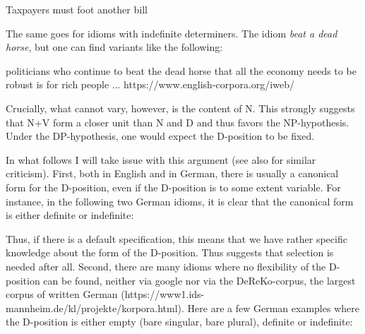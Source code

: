 \documentclass[output=paper,colorlinks,citecolor=black,
]{langscibook}
\begin{document}
\largerpage
 \ea Taxpayers must foot another bill
 \z
 
 The same goes for idioms with indefinite determiners. The idiom \textit{beat a dead horse}, but one can find variants like the following:
 
 \ea politicians who continue to beat the dead horse that all the economy needs to be robust is for rich people ... 
https://www.english-corpora.org/iweb/
 \z
 
 Crucially, what cannot vary, however, is the content of N. This strongly suggests that N+V form a closer unit than N and D and thus favors the NP-hypothesis. Under the DP-hypothesis, one would expect the D-position to be fixed.
 
 In what follows I will take issue with this argument (see also \citealt{Larson:to-appear:DP-hypothesisDP-CP} for similar criticism). First, both in English and in German, there is usually a canonical form for the D-position, even if the D-position is to some extent variable. For instance, in the following two German idioms, it is clear that the canonical form is either definite or indefinite:

 \ea
    \z
    \z
    
    Thus, if there is a default specification, this means that   we have rather specific knowledge about the form of the D-position. Thus suggests that selection is needed after all. Second, there are many idioms where no flexibility of the D-position can be found, neither via google nor via the DeReKo-corpus, the largest corpus of written German (https://www1.ids-mannheim.de/kl/projekte/korpora.html). Here are a few German examples where the D-position is either empty (bare singular, bare plural), definite or indefinite:
    
    \ea
    \z
    \z
   
\end{document}
